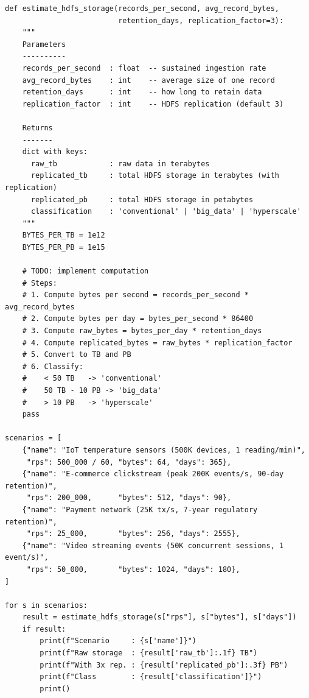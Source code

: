 \begin{lstlisting}[style=pyspark, caption={PE1.3: HDFS storage volume estimator}]
def estimate_hdfs_storage(records_per_second, avg_record_bytes,
                          retention_days, replication_factor=3):
    """
    Parameters
    ----------
    records_per_second  : float  -- sustained ingestion rate
    avg_record_bytes    : int    -- average size of one record
    retention_days      : int    -- how long to retain data
    replication_factor  : int    -- HDFS replication (default 3)

    Returns
    -------
    dict with keys:
      raw_tb            : raw data in terabytes
      replicated_tb     : total HDFS storage in terabytes (with replication)
      replicated_pb     : total HDFS storage in petabytes
      classification    : 'conventional' | 'big_data' | 'hyperscale'
    """
    BYTES_PER_TB = 1e12
    BYTES_PER_PB = 1e15

    # TODO: implement computation
    # Steps:
    # 1. Compute bytes per second = records_per_second * avg_record_bytes
    # 2. Compute bytes per day = bytes_per_second * 86400
    # 3. Compute raw_bytes = bytes_per_day * retention_days
    # 4. Compute replicated_bytes = raw_bytes * replication_factor
    # 5. Convert to TB and PB
    # 6. Classify:
    #    < 50 TB   -> 'conventional'
    #    50 TB - 10 PB -> 'big_data'
    #    > 10 PB   -> 'hyperscale'
    pass

scenarios = [
    {"name": "IoT temperature sensors (500K devices, 1 reading/min)",
     "rps": 500_000 / 60, "bytes": 64, "days": 365},
    {"name": "E-commerce clickstream (peak 200K events/s, 90-day retention)",
     "rps": 200_000,      "bytes": 512, "days": 90},
    {"name": "Payment network (25K tx/s, 7-year regulatory retention)",
     "rps": 25_000,       "bytes": 256, "days": 2555},
    {"name": "Video streaming events (50K concurrent sessions, 1 event/s)",
     "rps": 50_000,       "bytes": 1024, "days": 180},
]

for s in scenarios:
    result = estimate_hdfs_storage(s["rps"], s["bytes"], s["days"])
    if result:
        print(f"Scenario     : {s['name']}")
        print(f"Raw storage  : {result['raw_tb']:.1f} TB")
        print(f"With 3x rep. : {result['replicated_pb']:.3f} PB")
        print(f"Class        : {result['classification']}")
        print()
\end{lstlisting}
